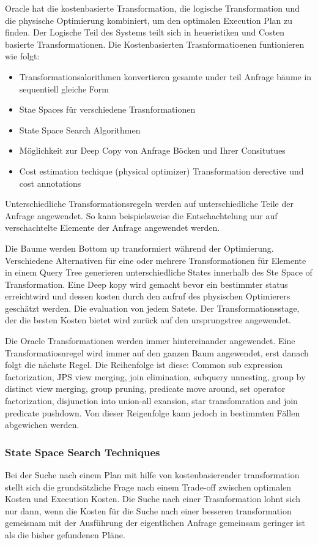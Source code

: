 Oracle hat die kostenbasierte Transformation, die logische Transformation und die physische Optimierung kombiniert, um den optimalen Execution Plan zu finden. Der Logische Teil des Systems teilt sich in heueristiken und Costen basierte Transformationen. Die Kostenbasierten Trasnformatioenen funtionieren wie folgt:

\begin{itemize}
\item Transformationsalorithmen konvertieren gesamte under teil Anfrage bäume in sequentiell gleiche Form
\item Stae Spaces für verschiedene Trasnformationen
\item State Space Search Algorithmen
\item Möglichkeit zur Deep Copy von Anfrage Böcken und Ihrer Consitutues
\item Cost estimation techique (physical optimizer)
Transformation derective und cost annotations
\end{itemize}

Unterschiedliche Transformationsregeln werden auf unterschiedliche Teile der Anfrage angewendet. So kann beispielsweise die Entschachtelung nur auf verschachtelte Elemente der Anfrage angewendet werden. 

Die Baume werden Bottom up transformiert während der Optimierung. Verschiedene Alternativen für eine oder mehrere Transformationen für Elemente in einem Query Tree generieren unterschiedliche States innerhalb des Ste Space of Transformation. Eine Deep kopy wird gemacht bevor ein bestimmter status erreichtwird und dessen kosten durch den aufruf des physischen Optimierers geschätzt werden. Die evaluation von jedem Satete. Der Transformationsstage, der die besten Kosten bietet wird zurück auf den ursprungstree angewendet.

Die Oracle Transformationen werden immer hintereinander angewendet. Eine Transformatiosnregel wird immer auf den ganzen Baum angewendet, erst danach folgt die nächste Regel. Die Reihenfolge ist diese: Common sub expression factorization, JPS view merging, join elimination, subquery unnesting, group by distinct view merging, group pruning, predicate move around, set operator factorization, disjunction into union-all exansion, star transfomration and join predicate pushdown. Von dieser Reigenfolge kann jedoch in bestimmten Fällen abgewichen werden. 



\subsubsection{State Space Search Techniques}
Bei der Suche nach einem Plan mit hilfe von kostenbasierender transformation stellt sich die grundsätzliche Frage nach einem Trade-off zwischen optimalen Kosten und Execution Kosten. Die Suche nach einer Trasnformation lohnt sich nur dann, wenn die Kosten für die Suche nach einer besseren transformation gemeisnam mit der Ausführung der eigentlichen Anfrage gemeinsam geringer ist als die bisher gefundenen Pläne.

